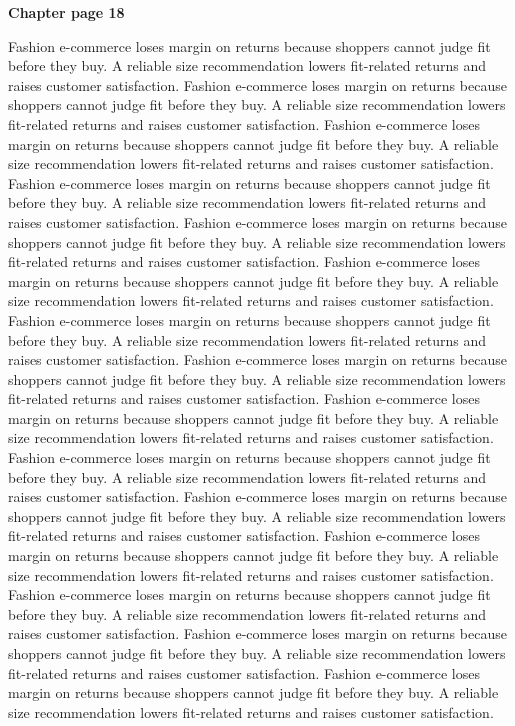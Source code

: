 \documentclass[a4paper,11pt]{article}
\begin{document}
{\headfont\bfseries\Large Chapter page 18}\par\medskip
Fashion e-commerce loses margin on returns because shoppers cannot judge fit before they buy. A reliable size recommendation lowers fit-related returns and raises customer satisfaction. Fashion e-commerce loses margin on returns because shoppers cannot judge fit before they buy. A reliable size recommendation lowers fit-related returns and raises customer satisfaction. Fashion e-commerce loses margin on returns because shoppers cannot judge fit before they buy. A reliable size recommendation lowers fit-related returns and raises customer satisfaction. Fashion e-commerce loses margin on returns because shoppers cannot judge fit before they buy. A reliable size recommendation lowers fit-related returns and raises customer satisfaction. Fashion e-commerce loses margin on returns because shoppers cannot judge fit before they buy. A reliable size recommendation lowers fit-related returns and raises customer satisfaction. 
Fashion e-commerce loses margin on returns because shoppers cannot judge fit before they buy. A reliable size recommendation lowers fit-related returns and raises customer satisfaction. Fashion e-commerce loses margin on returns because shoppers cannot judge fit before they buy. A reliable size recommendation lowers fit-related returns and raises customer satisfaction. Fashion e-commerce loses margin on returns because shoppers cannot judge fit before they buy. A reliable size recommendation lowers fit-related returns and raises customer satisfaction. Fashion e-commerce loses margin on returns because shoppers cannot judge fit before they buy. A reliable size recommendation lowers fit-related returns and raises customer satisfaction. Fashion e-commerce loses margin on returns because shoppers cannot judge fit before they buy. A reliable size recommendation lowers fit-related returns and raises customer satisfaction. 
Fashion e-commerce loses margin on returns because shoppers cannot judge fit before they buy. A reliable size recommendation lowers fit-related returns and raises customer satisfaction. Fashion e-commerce loses margin on returns because shoppers cannot judge fit before they buy. A reliable size recommendation lowers fit-related returns and raises customer satisfaction. Fashion e-commerce loses margin on returns because shoppers cannot judge fit before they buy. A reliable size recommendation lowers fit-related returns and raises customer satisfaction. Fashion e-commerce loses margin on returns because shoppers cannot judge fit before they buy. A reliable size recommendation lowers fit-related returns and raises customer satisfaction. Fashion e-commerce loses margin on returns because shoppers cannot judge fit before they buy. A reliable size recommendation lowers fit-related returns and raises customer satisfaction. \newpage
\end{document}
